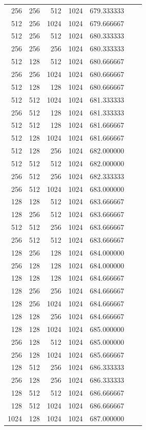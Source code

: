 \documentclass{article}
\begin{document}
{\begin{longtable}{rrrrrrr}
256 & 256 & 512 & 1024 & 679.333333 \\
512 & 256 & 1024 & 1024 & 679.666667 \\
512 & 256 & 512 & 1024 & 680.333333 \\
256 & 256 & 256 & 1024 & 680.333333 \\
512 & 128 & 512 & 1024 & 680.666667 \\
256 & 256 & 1024 & 1024 & 680.666667 \\
512 & 128 & 128 & 1024 & 680.666667 \\
512 & 512 & 1024 & 1024 & 681.333333 \\
256 & 512 & 128 & 1024 & 681.333333 \\
512 & 512 & 128 & 1024 & 681.666667 \\
512 & 128 & 1024 & 1024 & 681.666667 \\
512 & 128 & 256 & 1024 & 682.000000 \\
512 & 512 & 512 & 1024 & 682.000000 \\
256 & 512 & 256 & 1024 & 682.333333 \\
256 & 512 & 1024 & 1024 & 683.000000 \\
128 & 128 & 512 & 1024 & 683.666667 \\
128 & 256 & 512 & 1024 & 683.666667 \\
512 & 512 & 256 & 1024 & 683.666667 \\
256 & 512 & 512 & 1024 & 683.666667 \\
128 & 256 & 128 & 1024 & 684.000000 \\
256 & 128 & 128 & 1024 & 684.000000 \\
128 & 128 & 128 & 1024 & 684.666667 \\
128 & 256 & 256 & 1024 & 684.666667 \\
128 & 256 & 1024 & 1024 & 684.666667 \\
128 & 128 & 256 & 1024 & 684.666667 \\
128 & 128 & 1024 & 1024 & 685.000000 \\
256 & 128 & 512 & 1024 & 685.000000 \\
256 & 128 & 1024 & 1024 & 685.666667 \\
128 & 512 & 256 & 1024 & 686.333333 \\
256 & 128 & 256 & 1024 & 686.333333 \\
128 & 512 & 512 & 1024 & 686.666667 \\
128 & 512 & 1024 & 1024 & 686.666667 \\
1024 & 128 & 1024 & 1024 & 687.000000 \\

\end{longtable}}
\end{document}
